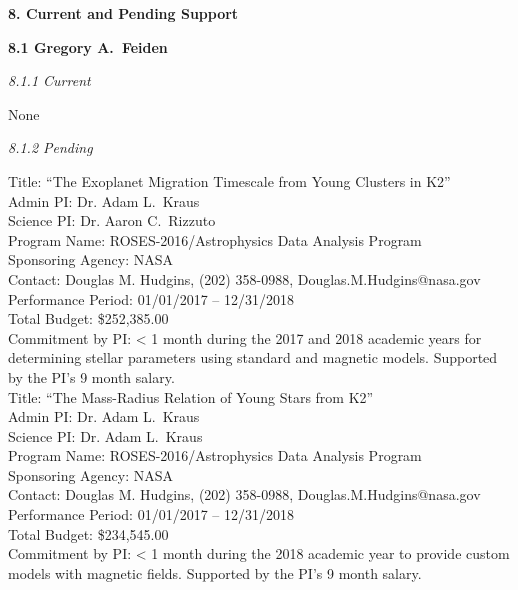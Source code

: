 %
%

{\bf\large 8. Current and Pending Support}  

{\bf 8.1 Gregory A.~Feiden} 

{\it 8.1.1 Current}

None 

{\it 8.1.2 Pending}

Title: ``The Exoplanet Migration Timescale from Young Clusters in K2'' \\
Admin PI: Dr. Adam L.\ Kraus \\
Science PI: Dr. Aaron C.\ Rizzuto \\
Program Name: ROSES-2016/Astrophysics Data Analysis Program \\
Sponsoring Agency: NASA \\
Contact: Douglas M. Hudgins, (202) 358-0988, Douglas.M.Hudgins@nasa.gov \\
Performance Period: 01/01/2017 -- 12/31/2018 \\
Total Budget: \$252,385.00 \\
Commitment by PI: < 1 month during the 2017 and 2018 academic years for determining stellar parameters using standard and magnetic models. Supported by the PI's 9 month salary. \\

Title: ``The Mass-Radius Relation of Young Stars from K2'' \\
Admin PI: Dr. Adam L.\ Kraus \\
Science PI: Dr. Adam L.\ Kraus \\
Program Name: ROSES-2016/Astrophysics Data Analysis Program \\
Sponsoring Agency: NASA \\
Contact: Douglas M. Hudgins, (202) 358-0988, Douglas.M.Hudgins@nasa.gov \\
Performance Period: 01/01/2017 -- 12/31/2018 \\
Total Budget: \$234,545.00 \\
Commitment by PI: < 1 month during the 2018 academic year to provide custom models with magnetic fields. Supported by the PI's 9 month salary. \\